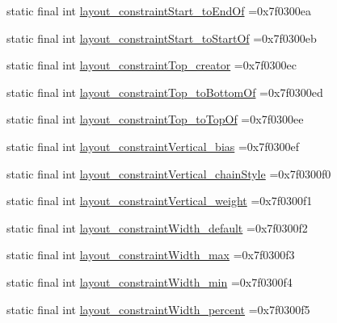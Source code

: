 \begin{DoxyCompactItemize}
static final int \mbox{\hyperlink{classcom_1_1example_1_1trainawearapplication_1_1_r_1_1attr_aa9d7703f07cfa469a46816b6a865ee30}{layout\+\_\+constraint\+Start\+\_\+to\+End\+Of}} =0x7f0300ea
\item 
static final int \mbox{\hyperlink{classcom_1_1example_1_1trainawearapplication_1_1_r_1_1attr_a10b6f4835baff9f8fdef56ee07a31091}{layout\+\_\+constraint\+Start\+\_\+to\+Start\+Of}} =0x7f0300eb
\item 
static final int \mbox{\hyperlink{classcom_1_1example_1_1trainawearapplication_1_1_r_1_1attr_aeb27640017a58164c73acb56c40d7653}{layout\+\_\+constraint\+Top\+\_\+creator}} =0x7f0300ec
\item 
static final int \mbox{\hyperlink{classcom_1_1example_1_1trainawearapplication_1_1_r_1_1attr_af53030c6c83202887597bbb31ef2ee77}{layout\+\_\+constraint\+Top\+\_\+to\+Bottom\+Of}} =0x7f0300ed
\item 
static final int \mbox{\hyperlink{classcom_1_1example_1_1trainawearapplication_1_1_r_1_1attr_a37fd90c107277bcbecb5838175b61fda}{layout\+\_\+constraint\+Top\+\_\+to\+Top\+Of}} =0x7f0300ee
\item 
static final int \mbox{\hyperlink{classcom_1_1example_1_1trainawearapplication_1_1_r_1_1attr_adad59185c23683397d0a9bd010bc1ff4}{layout\+\_\+constraint\+Vertical\+\_\+bias}} =0x7f0300ef
\item 
static final int \mbox{\hyperlink{classcom_1_1example_1_1trainawearapplication_1_1_r_1_1attr_abbd3aadd659e4175eaef3446d4df72fa}{layout\+\_\+constraint\+Vertical\+\_\+chain\+Style}} =0x7f0300f0
\item 
static final int \mbox{\hyperlink{classcom_1_1example_1_1trainawearapplication_1_1_r_1_1attr_a48b10a8767e7db303a507e332ac8c5e4}{layout\+\_\+constraint\+Vertical\+\_\+weight}} =0x7f0300f1
\item 
static final int \mbox{\hyperlink{classcom_1_1example_1_1trainawearapplication_1_1_r_1_1attr_ad6a7ea799528b858dd4ab4b7ea9c9191}{layout\+\_\+constraint\+Width\+\_\+default}} =0x7f0300f2
\item 
static final int \mbox{\hyperlink{classcom_1_1example_1_1trainawearapplication_1_1_r_1_1attr_a3f1498b07684ab907829f631288f4da8}{layout\+\_\+constraint\+Width\+\_\+max}} =0x7f0300f3
\item 
static final int \mbox{\hyperlink{classcom_1_1example_1_1trainawearapplication_1_1_r_1_1attr_a8f6b8b1dfa9da5b3b785aca470ae8cdb}{layout\+\_\+constraint\+Width\+\_\+min}} =0x7f0300f4
\item 
static final int \mbox{\hyperlink{classcom_1_1example_1_1trainawearapplication_1_1_r_1_1attr_adbbaf014b8b3f4a8b2b1728922ecebcc}{layout\+\_\+constraint\+Width\+\_\+percent}} =0x7f0300f5

\end{DoxyCompactItemize}
